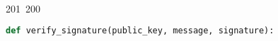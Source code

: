 201~200~\documentclass{article}
\begin{document}
\begin{lstlisting}[language=Python, caption=Signing and Verifying Messages]
	                                                                                                                                                                                                                                                                                                	                                                                                                                                        	    	                                                                                                	                                                                                                                                                                                                                                                                                                                                	                                                                        	                                                                        	                                                                                                                                        	                                                                                                                                                                                                                        	                                                                                                                            	                        def verify_signature(public_key, message, signature):
	                                                                                                                                                                                                                                                                                                	                                                                                                                                        	    	                                                                                                	                                                                                                                                                                                                                                                                                                                                	                                                                        	                                                                        	                                                                                                                                        	                                                                                                                                                                                                                        	                                                                                                                            	                            """

\end{lstlisting}
\end{document}
